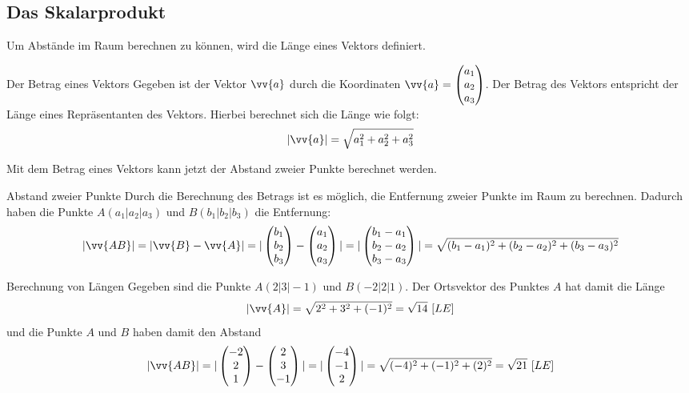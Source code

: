 \subsection{Das Skalarprodukt}
Um Abstände im Raum berechnen zu können, wird die Länge eines Vektors definiert.
\begin{defi}{Der Betrag eines Vektors}{}
Gegeben ist der Vektor $\vv{a}$ durch die Koordinaten $\vv{a} = \begin{pmatrix} a_1 \\a_2 \\a_3\end{pmatrix}$. Der Betrag des Vektors entspricht der Länge eines Repräsentanten des Vektors. Hierbei berechnet sich die Länge wie folgt: $$|\vv{a}| = \sqrt{a_1^2 + a_2^2 + a_3^2}$$
\end{defi}
Mit dem Betrag eines Vektors kann jetzt der Abstand zweier Punkte berechnet werden.
\begin{merke}{Abstand zweier Punkte}{}
Durch die Berechnung des Betrags ist es möglich, die Entfernung zweier Punkte im Raum zu berechnen. Dadurch haben die Punkte $A(a_1|a_2|a_3)$ und $B(b_1|b_2|b_3)$ die Entfernung: $$|\vv{AB}|=|\vv{B} - \vv{A}| = | \begin{pmatrix} b_1 \\b_2 \\b_3\end{pmatrix} -\begin{pmatrix} a_1 \\a_2 \\a_3\end{pmatrix}| = |\begin{pmatrix} b_1 - a_1 \\b_2 - a_2 \\b_3- a_3\end{pmatrix}| =\sqrt{(b_1-a_1)^2+ (b_2-a_2)^2 + (b_3-a_3)^2}$$
\end{merke}
\begin{bsp}{Berechnung von Längen}{}
Gegeben sind die Punkte $A(2|3|-1)$ und $B(-2|2|1)$. Der Ortsvektor des Punktes $A$ hat damit die Länge $$|\vv{A}| = \sqrt{2^2 +3^2 +(-1)^2} = \sqrt{14}\ [LE]$$ und die Punkte $A$ und $B$ haben damit den Abstand $$|\vv{AB}| = |\begin{pmatrix} -2 \\2 \\1\end{pmatrix} - \begin{pmatrix} 2 \\3 \\-1\end{pmatrix}| = |\begin{pmatrix} -4 \\-1 \\2\end{pmatrix}| = \sqrt{(-4)^2 +(-1)^2 + (2)^2} = \sqrt{21} \ [LE]$$
\end{bsp}
